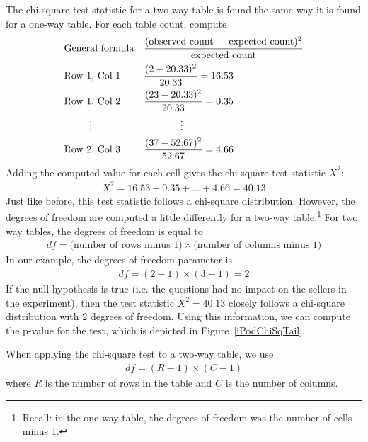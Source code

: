 The chi-square test statistic for a two-way table is found
the same way it is found for a one-way table.
For each table count, compute
\begin{align*}
&\text{General formula} &&
    \frac{(\text{observed count } - \text{expected count})^2}
        {\text{expected count}} \\
&\text{Row 1, Col 1} &&
    \frac{(\iPodAA - \iPodAExpected)^2}{\iPodAExpected} = 16.53 \\
&\text{Row 1, Col 2} &&
    \frac{(\iPodAB - \iPodAExpected)^2}{\iPodAExpected} = 0.35 \\
& \hspace{9mm}\vdots &&
    \hspace{13mm}\vdots \\
&\text{Row 2, Col 3} &&
    \frac{(\iPodBC - \iPodBExpected)^2}{\iPodBExpected} = 4.66
\end{align*}
Adding the computed value for each cell gives the chi-square test statistic $X^2$:
\begin{align*}
X^2 = 16.53 + 0.35 + \dots + 4.66 = 40.13
\end{align*}
Just like before, this test statistic follows a chi-square distribution. However, the degrees of freedom are computed a little differently for a two-way table.\footnote{Recall: in the one-way table, the degrees of freedom was the number of cells minus 1.} For two way tables, the degrees of freedom is equal to
\begin{align*}
df = \text{(number of rows minus 1)}\times \text{(number of columns minus 1)}
\end{align*}
In our example, the degrees of freedom parameter is
\begin{align*}
df = (2-1)\times (3-1) = 2
\end{align*}
If the null hypothesis is true
(i.e. the questions had no impact on the sellers in
    the experiment),
then the test statistic $X^2 = 40.13$ closely follows
a chi-square distribution with 2 degrees of freedom.
Using this information, we can compute the p-value for
the test, which is depicted in
Figure~\ref{iPodChiSqTail}.

\begin{termBox}{
  When applying the chi-square test to a two-way table,
  we use
  \begin{align*}
  df = (R-1)\times (C-1)
  \end{align*}
  where $R$ is the number of rows in the table
  and $C$ is the number of columns.}
\end{termBox}

